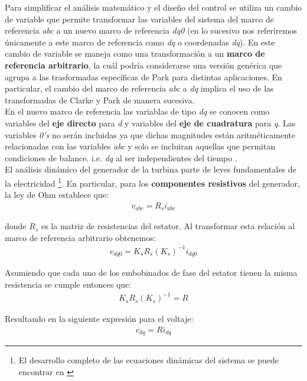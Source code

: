 {Para simplificar el análisis matemático y el diseño del control se utiliza un cambio de variable que permite transformar 
las variables del sistema del marco de referencia \emph{abc} a un nuevo marco de referencia \emph{dq0} (en lo sucesivo nos referiremos 
únicamente a este marco de referencia como \emph{dq} o coordenadas \emph{dq}). En \cite{krause2013} este cambio de variable se maneja como
una transformación a un \textbf{marco de referencia arbitrario}, la cuál podría considerarse una versión genérica que agrupa a las trasformadas
específicas de Park \cite{park1929} para distintas aplicaciones. En particular, el cambio del marco de referencia \emph{abc} a \emph{dq} implica el uso de 
las transformadas de Clarke \cite{clarke1943} y Park de manera sucesiva. 
\\

En el nuevo marco de referencia las variablas de tipo \emph{dq} se conocen como variables del \textbf{eje directo} para \emph{d} y variables 
del \textbf{eje de cuadratura} para \emph{q}. Las variables \emph{0's} no serán incluidas ya que dichas magnitudes están aritméticamente relacionadas
con las variables \emph{abc} y solo se incluiran aquellas que permitan condiciones de balance. i.e. \emph{dq} al ser independientes del tiempo \cite{krause2013,krause1998}.
\\

El análisis dinámico del generador de la turbina parte de leyes fundamentales de la electricidad
\footnote{El desarrollo completo de las ecuaciones dinámicas del sistema se puede encontrar en \cite{krause2013}}. 
En particular, para los \textbf{componentes resistivos} 
del generador, la ley de Ohm establece que:
\begin{align}
    v_{abc} = R_s i_{abc}
\end{align}

donde $R_s$ es la matriz de resistencias del estator. Al transformar esta relación al marco de referencia arbitrario obtenemos:
\begin{align}
    v_{dq0} = K_sR_s(K_s)^{-1} i_{dq0}
\end{align}

Asumiendo que cada uno de los embobinados de fase del estator tienen la misma resistencia se cumple entonces que:
\begin{align}
    K_sR_s(K_s)^{-1} = R
\end{align}

Resultando en la siguiente expresión para el voltaje:
\begin{align}
    v_{dq} = R i_{dq}
\end{align}

}
